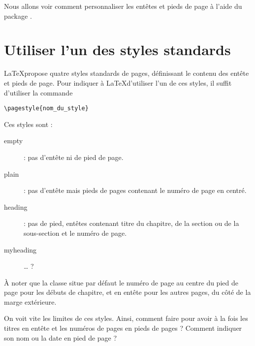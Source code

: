 
\begin{prealable}
Nous allons voir comment personnaliser les entêtes et pieds de page à l'aide du package .
\end{prealable}


\section{Utiliser l'un des styles standards}

\LaTeX propose quatre styles standards de pages, définissant le contenu des entête et pieds de page. Pour indiquer à \LaTeX d'utiliser l'un de ces styles, il suffit d'utiliser la commande 
\begin{verbatim}
\pagestyle{nom_du_style}
\end{verbatim} 

Ces styles sont :
\begin{description}
\item[empty]: pas d'entête ni de pied de page.
\item[plain]: pas d'entête mais pieds de pages contenant le numéro de page en centré.
\item[heading]: pas de pied, entêtes contenant titre du chapitre, de la section ou de la sous-section et le numéro de page.
\item[myheading] … ?
\end{description}

À noter que la classe  situe par défaut le numéro de page au centre du pied de page pour les débuts de chapitre, et en entête pour les autres pages, du côté de la marge extérieure.

On voit vite les limites de ces styles. Ainsi, comment faire pour avoir à la fois les titres en entête et les numéros de pages en pieds de pages ? Comment indiquer son nom ou la date en pied de page ?

